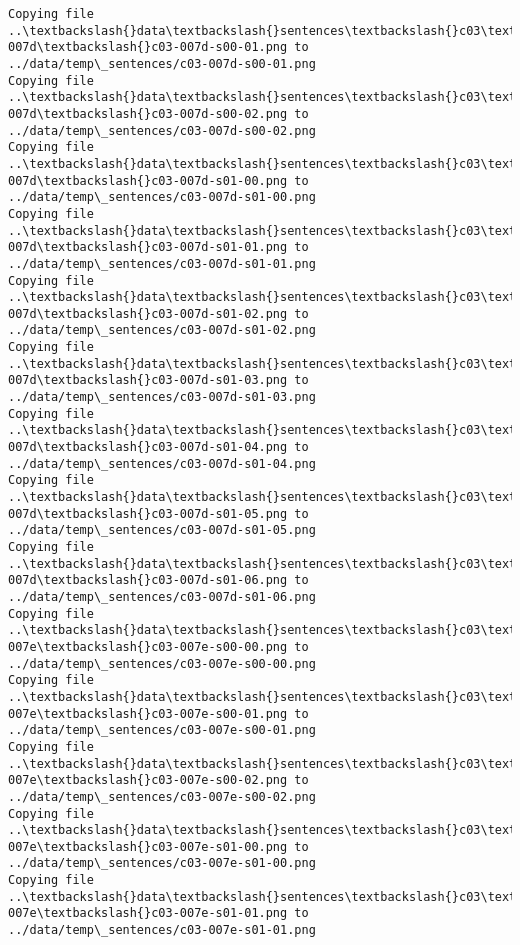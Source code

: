 \documentclass[11pt]{article}
\begin{document}
\begin{Verbatim}[commandchars=\\\{\}]
Copying file ..\textbackslash{}data\textbackslash{}sentences\textbackslash{}c03\textbackslash{}c03-007d\textbackslash{}c03-007d-s00-01.png to
../data/temp\_sentences/c03-007d-s00-01.png
Copying file ..\textbackslash{}data\textbackslash{}sentences\textbackslash{}c03\textbackslash{}c03-007d\textbackslash{}c03-007d-s00-02.png to
../data/temp\_sentences/c03-007d-s00-02.png
Copying file ..\textbackslash{}data\textbackslash{}sentences\textbackslash{}c03\textbackslash{}c03-007d\textbackslash{}c03-007d-s01-00.png to
../data/temp\_sentences/c03-007d-s01-00.png
Copying file ..\textbackslash{}data\textbackslash{}sentences\textbackslash{}c03\textbackslash{}c03-007d\textbackslash{}c03-007d-s01-01.png to
../data/temp\_sentences/c03-007d-s01-01.png
Copying file ..\textbackslash{}data\textbackslash{}sentences\textbackslash{}c03\textbackslash{}c03-007d\textbackslash{}c03-007d-s01-02.png to
../data/temp\_sentences/c03-007d-s01-02.png
Copying file ..\textbackslash{}data\textbackslash{}sentences\textbackslash{}c03\textbackslash{}c03-007d\textbackslash{}c03-007d-s01-03.png to
../data/temp\_sentences/c03-007d-s01-03.png
Copying file ..\textbackslash{}data\textbackslash{}sentences\textbackslash{}c03\textbackslash{}c03-007d\textbackslash{}c03-007d-s01-04.png to
../data/temp\_sentences/c03-007d-s01-04.png
Copying file ..\textbackslash{}data\textbackslash{}sentences\textbackslash{}c03\textbackslash{}c03-007d\textbackslash{}c03-007d-s01-05.png to
../data/temp\_sentences/c03-007d-s01-05.png
Copying file ..\textbackslash{}data\textbackslash{}sentences\textbackslash{}c03\textbackslash{}c03-007d\textbackslash{}c03-007d-s01-06.png to
../data/temp\_sentences/c03-007d-s01-06.png
Copying file ..\textbackslash{}data\textbackslash{}sentences\textbackslash{}c03\textbackslash{}c03-007e\textbackslash{}c03-007e-s00-00.png to
../data/temp\_sentences/c03-007e-s00-00.png
Copying file ..\textbackslash{}data\textbackslash{}sentences\textbackslash{}c03\textbackslash{}c03-007e\textbackslash{}c03-007e-s00-01.png to
../data/temp\_sentences/c03-007e-s00-01.png
Copying file ..\textbackslash{}data\textbackslash{}sentences\textbackslash{}c03\textbackslash{}c03-007e\textbackslash{}c03-007e-s00-02.png to
../data/temp\_sentences/c03-007e-s00-02.png
Copying file ..\textbackslash{}data\textbackslash{}sentences\textbackslash{}c03\textbackslash{}c03-007e\textbackslash{}c03-007e-s01-00.png to
../data/temp\_sentences/c03-007e-s01-00.png
Copying file ..\textbackslash{}data\textbackslash{}sentences\textbackslash{}c03\textbackslash{}c03-007e\textbackslash{}c03-007e-s01-01.png to
../data/temp\_sentences/c03-007e-s01-01.png

\end{Verbatim}
\end{document}

